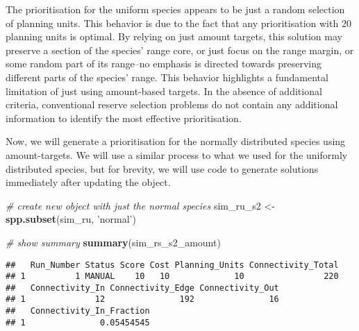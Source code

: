 \documentclass[11pt,]{article}
\newenvironment{Shaded}{\begin{snugshade}}{\end{snugshade}}
\newcommand{\KeywordTok}[1]{\textcolor[rgb]{0.13,0.29,0.53}{\textbf{{#1}}}}
\newcommand{\DataTypeTok}[1]{\textcolor[rgb]{0.13,0.29,0.53}{{#1}}}
\newcommand{\FloatTok}[1]{\textcolor[rgb]{0.00,0.00,0.81}{{#1}}}
\newcommand{\StringTok}[1]{\textcolor[rgb]{0.31,0.60,0.02}{{#1}}}
\newcommand{\CommentTok}[1]{\textcolor[rgb]{0.56,0.35,0.01}{\textit{{#1}}}}
\newcommand{\OtherTok}[1]{\textcolor[rgb]{0.56,0.35,0.01}{{#1}}}
\newcommand{\NormalTok}[1]{{#1}}
\begin{document}
The prioritisation for the uniform species appears to be just a random
selection of planning units. This behavior is due to the fact that any
prioritisation with 20 planning units is optimal. By relying on just
amount targets, this solution may preserve a section of the species'
range core, or just focus on the range margin, or some random part of
its range--no emphasis is directed towards preserving different parts of
the species' range. This behavior highlights a fundamental limitation of
just using amount-based targets. In the absence of additional criteria,
conventional reserve selection problems do not contain any additional
information to identify the most effective prioritisation.

Now, we will generate a prioritisation for the normally distributed
species using amount-targets. We will use a similar process to what we
used for the uniformly distributed species, but for brevity, we will use
code to generate solutions immediately after updating the object.

\begin{Shaded}
\begin{Highlighting}[]
\CommentTok{# create new object with just the normal species}
\NormalTok{sim_ru_s2 <-}\StringTok{ }\KeywordTok{spp.subset}\NormalTok{(sim_ru, }\StringTok{'normal'}\NormalTok{)}
\end{Highlighting}
\end{Shaded}

\begin{Shaded}
\end{Shaded}

\begin{Shaded}
\begin{Highlighting}[]
\CommentTok{# show summary}
\KeywordTok{summary}\NormalTok{(sim_rs_s2_amount)}
\end{Highlighting}
\end{Shaded}

\begin{verbatim}
##   Run_Number Status Score Cost Planning_Units Connectivity_Total
## 1          1 MANUAL    10   10             10                220
##   Connectivity_In Connectivity_Edge Connectivity_Out
## 1              12               192               16
##   Connectivity_In_Fraction
## 1               0.05454545
\end{verbatim}
\end{document}
